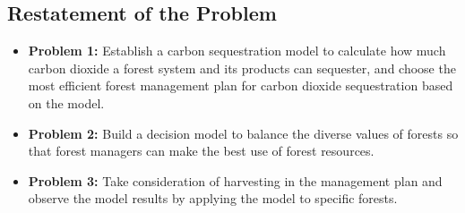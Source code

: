 \subsection{Restatement of the Problem}
\begin{itemize}

\item \textbf{Problem 1:} Establish a carbon sequestration model to calculate how much carbon dioxide a forest system and its products can sequester, and choose the most efficient forest management plan for carbon dioxide sequestration based on the model.

\item \textbf{Problem 2:} Build a decision model to balance the diverse values of forests so that forest managers can make the best use of forest resources.

\item \textbf{Problem 3:} Take consideration of harvesting in the management plan and observe the model results by applying the model to specific forests.


\end{itemize}
